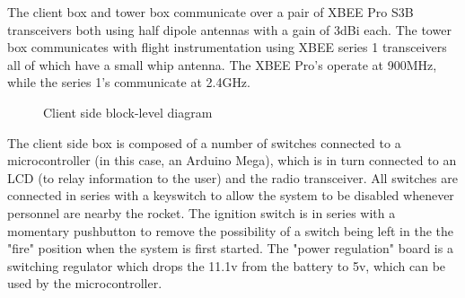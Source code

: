 \documentclass[letter]{article}
\begin{document}
The client box and tower box communicate over a pair of XBEE Pro S3B
transceivers both using half dipole antennas with a gain of 3dBi each. The
tower box communicates with flight instrumentation using XBEE series 1
transceivers all of which have a small whip antenna. The XBEE Pro's operate
at 900MHz, while the series 1's communicate at 2.4GHz.

\begin{figure}[H]
\centering
{}
\caption{Client side block-level diagram}
\end{figure}

The client side box is composed of a number of switches connected to a 
microcontroller (in this case, an Arduino Mega), which is in turn connected
to an LCD (to relay information to the user) and the radio transceiver. All
switches are connected in series with a keyswitch to allow the system to be
disabled whenever personnel are nearby the rocket. The ignition switch is in
series with a momentary pushbutton to remove the possibility of a switch being
left in the the "fire" position when the system is first started. The "power
regulation" board is a switching regulator which drops the 11.1v from the battery
to 5v, which can be used by the microcontroller.
\end{document}
